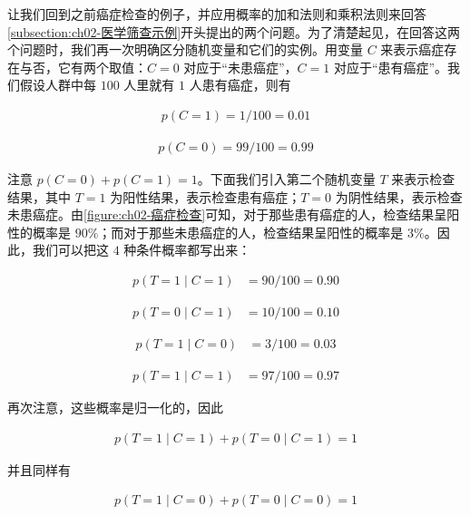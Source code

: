 \documentclass[../../main.tex]{subfiles}
\begin{document}
让我们回到之前癌症检查的例子，并应用概率的加和法则和乘积法则来回答\cref{subsection:ch02-医学筛查示例}开头提出的两个问题。为了清楚起见，在回答这两个问题时，我们再一次明确区分随机变量和它们的实例。用变量 $C$ 来表示癌症存在与否，它有两个取值：$C=0$ 对应于“未患癌症”，$C=1$ 对应于“患有癌症”。我们假设人群中每 $100$ 人里就有 $1$ 人患有癌症，则有

\begin{align}
  p(C=1) = 1/100 = 0.01
  \label{align:ch02-患癌先验}
\end{align}

\begin{align}
  p(C=0) = 99/100 = 0.99
  \label{align:ch02-未患癌先验}
\end{align}

注意 $p(C=0)+p(C=1)=1$。下面我们引入第二个随机变量 $T$ 来表示检查结果，其中 $T=1$ 为阳性结果，表示检查患有癌症；$T=0$ 为阴性结果，表示检查未患癌症。由\cref{figure:ch02-癌症检查}可知，对于那些患有癌症的人，检查结果呈阳性的概率是 $90\%$；而对于那些未患癌症的人，检查结果呈阳性的概率是 $3\%$。因此，我们可以把这 $4$ 种条件概率都写出来：

\begin{align}
  p(T=1\mid C=1) &= 90/100 = 0.90
  \label{align:ch02-条件概率a}
\end{align}

\begin{align}
  p(T=0\mid C=1) &= 10/100 = 0.10
  \label{align:ch02-条件概率b}
\end{align}

\begin{align}
  p(T=1\mid C=0) &= 3/100 = 0.03
  \label{align:ch02-条件概率c}
\end{align}

\begin{align}
  p(T=1\mid C=1) &= 97/100 = 0.97
  \label{align:ch02-条件概率d}
\end{align}

再次注意，这些概率是归一化的，因此

\begin{align}
  p(T=1\mid C=1) + p(T=0\mid C=1) = 1
  \label{align:ch02-条件归一化C1}
\end{align}

并且同样有

\begin{align}
  p(T=1\mid C=0) + p(T=0\mid C=0) = 1
  \label{align:ch02-条件归一化C0}
\end{align}
\end{document}
